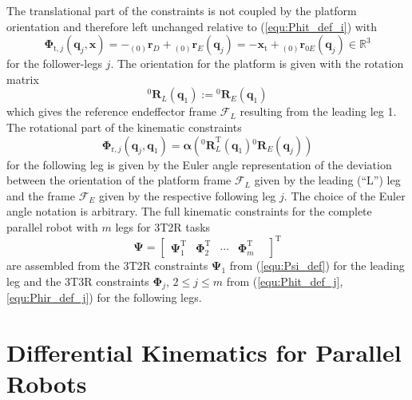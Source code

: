 \documentclass[robotics,article,submit,moreauthors,pdftex]{Definitions/mdpi}
\newcommand{\bm}[1]{\boldsymbol{#1}}
\newcommand{\ortvek}[4]{{ }_{(#1)}{\boldsymbol{#2}}^{#3}_{#4} }
\newcommand{\rotmat}[2]{{{ }^{#1}\boldsymbol{R}}_{#2}}
\newcommand{\transp}[0]{{\mathrm{T}}}
\newcommand{\ks}[1]{{\mathcal{F}}_{#1}}
\begin{document}
The translational part of the constraints is not coupled by the platform orientation and therefore left unchanged relative to (\ref{equ:Phit_def_i}) with
%
\begin{equation}
\bm{\Phi}_{\mathrm{t},j}(\bm{q}_j,\bm{x})
= 
- \ortvek{0}{r}{}{D} + \ortvek{0}{r}{}{E}(\bm{q}_j)
=
- \bm{x}_{\mathrm{t}} + \ortvek{0}{r}{}{0E}(\bm{q}_j) \in {\mathbb{R}}^{3}
\label{equ:Phit_def_j}
\end{equation}
%
for the follower-legs $j$. The orientation for the platform is given with the rotation matrix
%
\begin{equation}
\rotmat{0}{L}(\bm{q}_1)
:= 
\rotmat{0}{E}(\bm{q}_1)
\end{equation}
%
which gives the reference endeffector frame $\ks{L}$ resulting from the leading leg 1.
The rotational part of the kinematic constraints
%
\begin{equation}
\bm{\Phi}_{\mathrm{r},j}(\bm{q}_j,\bm{q}_1)
=
\bm{\alpha}(\rotmat{0}{L}^\mathrm{T}(\bm{q}_1)\rotmat{0}{E}(\bm{q}_j))
\label{equ:Phir_def_j}
\end{equation}
%
for the following leg is given by the Euler angle representation of the deviation between the orientation of the platform frame $\ks{L}$ given by the leading (``L'') leg and the frame $\ks{E}$ given by the respective following leg $j$.
The choice of the Euler angle notation is arbitrary.
The full kinematic constraints for the complete parallel robot with $m$ legs for 3T2R tasks
%
\begin{equation}
\bm{\Psi}
=
\begin{bmatrix}
\bm{\Psi}_1^\transp &
\bm{\Phi}_2^\transp &
\cdots &
\bm{\Phi}_m^\transp &
\end{bmatrix}^\transp
\label{equ:constr_Psi_PKM}
\end{equation}
%
are assembled from the 3T2R constraints $\bm{\Psi}_1$ from (\ref{equ:Psi_def}) for the leading leg and the 3T3R constraints $\bm{\Phi}_j$, $2\le{}j\le{}m$ from (\ref{equ:Phit_def_j},\ref{equ:Phir_def_j}) for the following legs.


\section{Differential Kinematics for Parallel Robots}
\label{sec:ZB_Anwendung}

\end{document}
